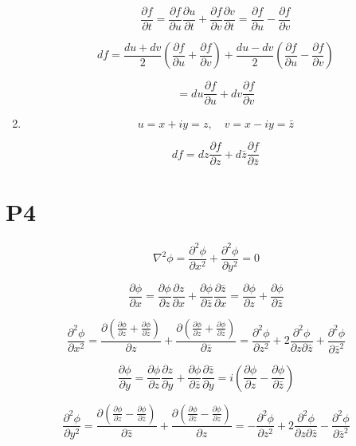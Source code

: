 \documentclass[12pt]{article}
\begin{document}
\begin{enumerate}
          \[
              \frac{\partial f}{\partial t}
              = \frac{\partial f}{\partial u} \frac{\partial u}{\partial t} + \frac{\partial f}{\partial v} \frac{\partial v}{\partial t}
              = \frac{\partial f}{\partial u} - \frac{\partial f}{\partial v}
          \]

          \[
              df = \frac{du + dv}{2} (\frac{\partial f}{\partial u} + \frac{\partial f}{\partial v})  + \frac{du - dv}{2} (\frac{\partial f}{\partial u} - \frac{\partial f}{\partial v})
          \]

          \[
              = du\frac{\partial f}{\partial u} + dv\frac{\partial f}{\partial v}
          \]
    \item
          \[
              u = x + iy = z,\quad v = x - iy = \bar{z}
          \]

          \[
              df = dz \frac{\partial f}{\partial z} + d\bar{z} \frac{\partial f}{\partial \bar{z}}
          \]
\end{enumerate}

\newpage

\section{P4}

\[
    \nabla^2 \phi = \frac{\partial^2 \phi}{\partial x^2} + \frac{\partial^2 \phi}{\partial y^2} = 0
\]

\[
    \frac{\partial \phi}{\partial x} = \frac{\partial \phi}{\partial z} \frac{\partial z}{\partial x} + \frac{\partial \phi}{\partial \bar{z}} \frac{\partial \bar{z}}{\partial x}
    = \frac{\partial \phi}{\partial z} + \frac{\partial \phi}{\partial \bar{z}}
\]

\[
    \frac{\partial^2 \phi}{\partial x^2}
    = \frac{\partial (\frac{\partial \phi}{\partial z} + \frac{\partial \phi}{\partial \bar{z}})}{\partial z} + \frac{\partial (\frac{\partial \phi}{\partial z} + \frac{\partial \phi}{\partial \bar{z}})}{\partial \bar{z}}
    = \frac{\partial^2 \phi}{\partial z^2} + 2 \frac{\partial^2 \phi}{\partial z \partial \bar{z}} + \frac{\partial^2 \phi}{\partial \bar{z}^2}
\]

\[
    \frac{\partial \phi}{\partial y} = \frac{\partial \phi}{\partial z} \frac{\partial z}{\partial y} + \frac{\partial \phi}{\partial \bar{z}} \frac{\partial \bar{z}}{\partial y}
    = i(\frac{\partial \phi}{\partial z} - \frac{\partial \phi}{\partial \bar{z}})
\]

\[
    \frac{\partial^2 \phi}{\partial y^2}
    = \frac{\partial (\frac{\partial \phi}{\partial z} - \frac{\partial \phi}{\partial \bar{z}})}{\partial \bar{z}}
    + \frac{\partial (\frac{\partial \phi}{\partial \bar{z}} - \frac{\partial \phi}{\partial z})}{\partial z}
    = -\frac{\partial^2 \phi}{\partial z^2} + 2 \frac{\partial^2 \phi}{\partial z \partial \bar{z}} - \frac{\partial^2 \phi}{\partial \bar{z}^2}
\]
\end{document}
